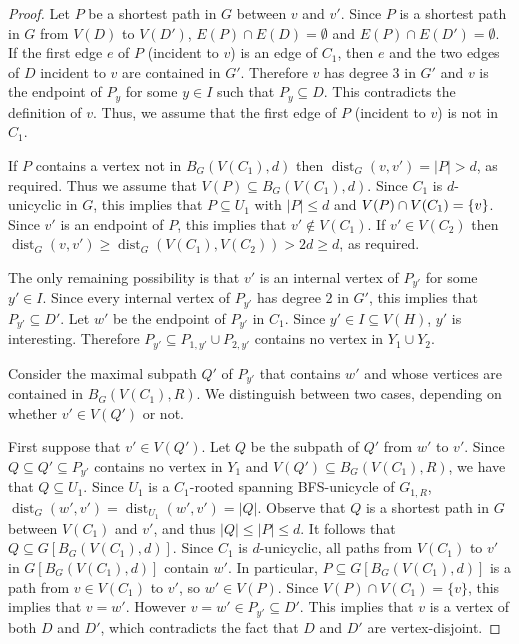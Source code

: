 \documentclass{patmorin}
\newcommand{\gwen}[1]{\textcolor{Purple}{Gwen: #1}}
\newcommand{\piotr}[1]{\textcolor{red}{Piotr: #1}}
\DeclareMathOperator{\dist}{dist}
\DeclarePairedDelimiter\set{\{}{\}}
\begin{document}
\begin{proof}
    
    Let $P$ be a shortest path in $G$ between $v$ and $v'$.  Since $P$ is a shortest path in $G$ from $V(D)$ to $V(D')$, $E(P)\cap E(D)=\emptyset$ and $E(P)\cap E(D')=\emptyset$.  If the first edge $e$ of $P$ (incident to $v$) is an edge of $C_1$, then $e$ and the two edges of $D$ incident to $v$ are contained in $G'$. Therefore $v$ has degree $3$ in $G'$ and $v$ is the endpoint of $P_y$ for some $y\in I$ such that $P_y\subseteq D$.  This contradicts the definition of $v$.
    Thus, we assume that the first edge of $P$ (incident to $v$) is not in $C_1$. 

    If $P$ contains a vertex not in $B_G(V(C_1),d)$ then $\dist_G(v,v')=|P|>d$, as required.  Thus we assume that $V(P)\subseteq B_G(V(C_1),d)$. 
    Since $C_1$ is $d$-unicyclic in $G$, this implies that $P\subseteq U_1$ with $|P|\leq d$ and $V(P)\cap V(C_1)=\set{v}$.     
    Since $v'$ is an endpoint of $P$, this implies that $v'\notin V(C_1)$.  If $v'\in V(C_2)$ then $\dist_G(v,v')\ge \dist_G(V(C_1),V(C_2))>2d\geq d$, as required.

    The only remaining possibility is that $v'$ is an internal vertex of $P_{y'}$ for some $y'\in I$.  Since every internal vertex of $P_{y'}$ has degree $2$ in $G'$, this implies that  $P_{y'}\subseteq D'$.  
    Let $w'$ be the endpoint of $P_{y'}$ in $C_1$. Since $y'\in I\subseteq V(H)$, $y'$ is interesting.  
    Therefore $P_{y'}\subseteq P_{1,y'}\cup P_{2,y'}$ contains no vertex in $Y_1\cup Y_2$.

    Consider the maximal subpath $Q'$ of $P_{y'}$ that contains $w'$ and whose vertices are contained in $B_G(V(C_1),R)$.  We distinguish between two cases, depending on whether $v'\in V(Q')$ or not.

    First suppose that $v'\in V(Q')$.  
    Let $Q$ be the subpath of $Q'$ from $w'$ to $v'$. Since $Q\subseteq Q'\subseteq P_{y'}$ contains  no vertex in $Y_1$ and $V(Q')\subseteq B_G(V(C_1),R)$, we have that $Q\subseteq U_1$. Since $U_1$ is a $C_1$-rooted spanning BFS-unicycle of $G_{1,R}$, $\dist_G(w',v')=\dist_{U_1}(w',v')=|Q|$.  
    Observe that $Q$ is a shortest path in $G$ between $V(C_1)$ and $v'$, and thus $|Q| \leq |P| \leq d$. 
    It follows that $Q\subseteq G[B_G(V(C_1),d)]$.  
    Since $C_1$ is $d$-unicyclic, all paths from $V(C_1)$ to $v'$ in $G[B_G(V(C_1),d)]$ contain $w'$. 
    In particular, $P\subseteq G[B_G(V(C_1),d)]$ is a path from $v\in V(C_1)$ to $v'$, so $w'\in V(P)$.  Since $V(P)\cap V(C_1)=\{v\}$, this implies that $v=w'$. 
    However $v=w' \in P_{y'}\subseteq D'$. This implies that $v$ is a vertex of both $D$ and $D'$, which contradicts the fact that $D$ and $D'$ are vertex-disjoint.


\end{proof}
\end{document}
